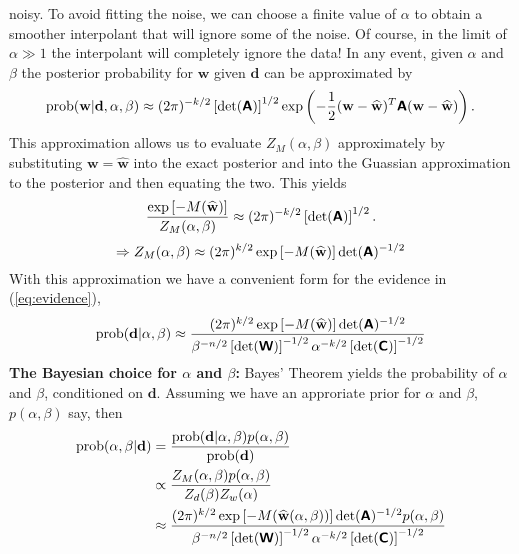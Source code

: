 \documentclass[11pt]{article}
\newcommand{\p}{\mbox{prob}}
\newcommand{\w}{\mathbf{w}}
\newcommand{\wmp}{\widehat{\mathbf{w}}}
\newcommand{\dat}{\mathbf{d}}
\def\A{\boldsymbol{\sf A}}
\def\C{\boldsymbol{\sf C}}
\def\W{\boldsymbol{\sf W}}
\def\p{\mbox{prob}}
\begin{document}
noisy. To avoid fitting the noise, we can choose a finite value of
$\alpha$ to obtain a smoother interpolant that will ignore some of the
noise. Of course, in the limit of $\alpha \gg 1$ the interpolant will
completely ignore the data!
\newline
\noindent
In any event, given $\alpha$ and $\beta$ the posterior probability for
$\w$ given $\dat$ can be approximated by
\begin{equation}
  \p(\w|\dat,\alpha,\beta) \approx (2\pi)^{-k/2}\left[\det(\A)\right]^{1/2}\exp\left(-\frac{1}{2}(\w-\wmp)^T\A(\w-\wmp)\right).
\end{equation}
This approximation allows us to evaluate $Z_M(\alpha,\beta)$
approximately by substituting $\w = \wmp$ into the exact posterior and
into the Guassian approximation to the posterior and then equating the
two. This yields
\begin{equation}
  \frac{\exp\left[-M(\wmp)\right]}{Z_M(\alpha,\beta)} \approx (2\pi)^{-k/2}\left[\det(\A)\right]^{1/2}.
\end{equation}
\begin{equation}
\Rightarrow Z_M(\alpha,\beta) \approx (2\pi)^{k/2}\exp\left[-M(\wmp)\right]\det(\A)^{-1/2}
\end{equation}
With this approximation we have a convenient form for the evidence in (\ref{eq:evidence}),
\begin{equation}
  \p(\dat|\alpha,\beta) \approx \frac{ (2\pi)^{k/2}\exp\left[-M(\wmp)\right]\det(\A)^{-1/2}}{
    \beta^{-n/2} \left[ \det(\W) \right]^{-1/2} \alpha^{-k/2} \left[ \det(\C) \right]^{-1/2} }
\end{equation}
\newline
\noindent
{\bf The Bayesian choice for $\alpha$ and $\beta$:}
Bayes' Theorem yields the probability of $\alpha$ and $\beta$, conditioned on $\dat$.
Assuming we have an approriate prior for $\alpha$ and $\beta$, $p(\alpha,\beta)$ say, then
\begin{equation}
  \begin{split}
    \p(\alpha,\beta|\dat) &= \frac{\p(\dat|\alpha,\beta)p(\alpha,\beta)}{\p(\dat)}\\
    &\propto \frac{Z_M(\alpha,\beta)p(\alpha,\beta)}{Z_d(\beta)Z_w(\alpha)}\\
    &\approx 
    \frac{ (2\pi)^{k/2}\exp\left[-M(\wmp(\alpha,\beta))\right]\det(\A)^{-1/2}p(\alpha,\beta)}{
    \beta^{-n/2} \left[ \det(\W) \right]^{-1/2} \alpha^{-k/2} \left[ \det(\C) \right]^{-1/2} }
  \end{split}
\end{equation}
\end{document}

